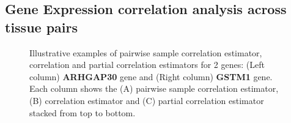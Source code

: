 




\subsection*{Gene Expression correlation analysis across tissue pairs}

\begin{figure}[!tpb]
\centering
{}
\caption{\small {{Illustrative examples of pairwise sample correlation estimator, \Robocov{} correlation and partial correlation estimators for 2 genes}:
(Left column)  \textbf{ARHGAP30} gene and (Right column) \textbf{GSTM1} gene. Each column shows the (A) pairwise sample correlation estimator, (B) \Robocov{} correlation estimator and  (C) partial correlation estimator stacked from top to bottom.}}
\label{fig:gtex_demo}
\end{figure}


